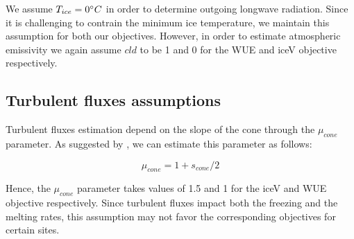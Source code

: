 \documentclass[tc, manuscript]{copernicus}
\begin{document}
We assume $T_{ice} = 0 ^{\circ} C$ in order to determine outgoing longwave radiation. Since it is challenging to
contrain the minimum ice temperature, we maintain this assumption for both our objectives. However, in order to
estimate atmospheric emissivity we again assume $cld$ to be 1 and 0 for the WUE and iceV objective respectively.

\subsection{Turbulent fluxes assumptions} \label{sec:Qs}

Turbulent fluxes estimation depend on the slope of the cone through the $\mu_{cone}$ parameter. As suggested 
by \citet{oerlemansBriefCommunicationGrowth2021}, we can estimate this parameter as follows:

\begin{equation}
  \mu_{cone} =1 + s_{cone}/2
\end{equation}

Hence, the $\mu_{cone}$ parameter takes values of 1.5 and 1 for the iceV and WUE objective respectively.  Since
turbulent fluxes impact both the freezing and the melting rates, this assumption may not favor the corresponding
objectives for certain sites.


\noappendix 



\end{document}
